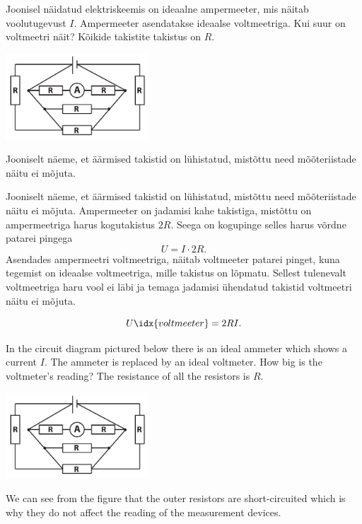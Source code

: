 
Joonisel näidatud elektriskeemis on ideaalne ampermeeter, mis näitab voolutugevust $I$. Ampermeeter asendatakse ideaalse voltmeetriga. Kui suur on voltmeetri näit? Kõikide takistite takistus on $R$.
\begin{center}
	\includegraphics[width=0.4\textwidth]{2017-v2g-01-skeem}
\end{center}

\hint
Jooniselt näeme, et äärmised takistid on lühistatud, mistõttu need mõõteriistade näitu ei mõjuta.

\solu
Jooniselt näeme, et äärmised takistid on lühistatud, mistõttu need mõõteriistade näitu ei mõjuta. Ampermeeter on jadamisi kahe takistiga, mistõttu on ampermeetriga harus kogutakistus $2R$. Seega on kogupinge selles harus võrdne patarei pingega
\[ U = I\cdot 2R.\]
Asendades ampermeetri voltmeetriga, näitab voltmeeter patarei pinget, kuna tegemist on ideaalse voltmeetriga, mille takistus on lõpmatu. Sellest tulenevalt voltmeetriga haru vool ei läbi ja temaga jadamisi ühendatud takistid voltmeetri näitu ei mõjuta.

\[ U\idx{voltmeeter} = 2RI.\]

In the circuit diagram pictured below there is an ideal ammeter which shows a current $I$. The ammeter is replaced by an ideal voltmeter. How big is the voltmeter’s reading? The resistance of all the resistors is $R$.
\begin{center}
	\includegraphics[width=0.4\textwidth]{2017-v2g-01-skeem}
\end{center}

\hinteng
We can see from the figure that the outer resistors are short-circuited which is why they do not affect the reading of the measurement devices.


